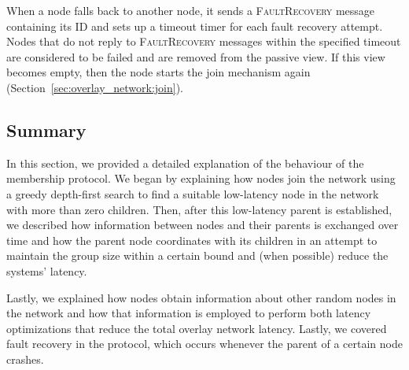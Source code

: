 When a node falls back to another node, it sends a \textsc{FaultRecovery} message containing its ID and sets up a timeout timer for each fault recovery attempt. Nodes that do not reply to \textsc{FaultRecovery} messages within the specified timeout are considered to be failed and are removed from the passive view. If this view becomes empty, then the node starts the join mechanism again (Section~\ref{sec:overlay_network:join}).

\subsection{Summary}

In this section, we provided a detailed explanation of the behaviour of the membership protocol. We began by explaining how nodes join the network using a greedy depth-first search to find a suitable low-latency node in the network with more than zero children. Then, after this low-latency parent is established, we described how information between nodes and their parents is exchanged over time and how the parent node coordinates with its children in an attempt to maintain the group size within a certain bound and (when possible) reduce the systems' latency.

Lastly, we explained how nodes obtain information about other random nodes in the network and how that information is employed to perform both latency optimizations that reduce the total overlay network latency. Lastly, we covered fault recovery in the protocol, which occurs whenever the parent of a certain node crashes.